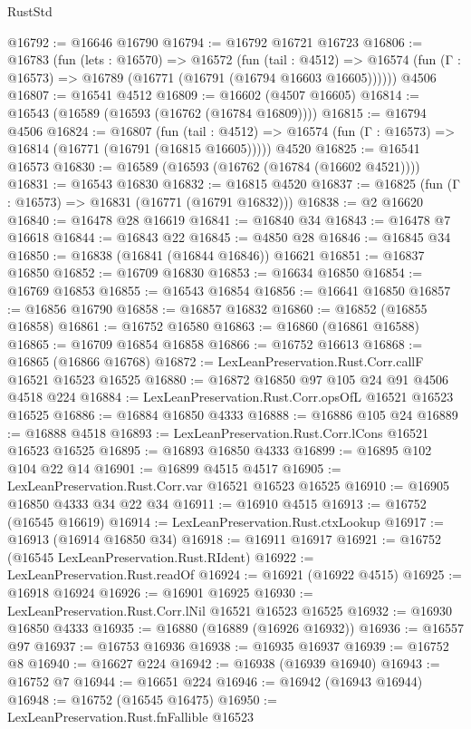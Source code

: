 \begin{lexlean}{RustStd}
\begin{coremodule}
@16792 := @16646 @16790
@16794 := @16792 @16721 @16723
@16806 := @16783
    (fun (lets : @16570) =>
    @16572
      (fun (tail : @4512) =>
      @16574 (fun (Γ : @16573) => @16789 (@16771 (@16791 (@16794 @16603 @16605))))))
    @4506
@16807 := @16541 @4512
@16809 := @16602 (@4507 @16605)
@16814 := @16543 (@16589 (@16593 (@16762 (@16784 @16809))))
@16815 := @16794 @4506
@16824 := @16807
    (fun (tail : @4512) => @16574 (fun (Γ : @16573) => @16814 (@16771 (@16791 (@16815 @16605)))))
    @4520
@16825 := @16541 @16573
@16830 := @16589 (@16593 (@16762 (@16784 (@16602 @4521))))
@16831 := @16543 @16830
@16832 := @16815 @4520
@16837 := @16825 (fun (Γ : @16573) => @16831 (@16771 (@16791 @16832)))
@16838 := @2 @16620
@16840 := @16478 @28 @16619
@16841 := @16840 @34
@16843 := @16478 @7 @16618
@16844 := @16843 @22
@16845 := @4850 @28
@16846 := @16845 @34
@16850 := @16838 (@16841 (@16844 @16846)) @16621
@16851 := @16837 @16850
@16852 := @16709 @16830
@16853 := @16634 @16850
@16854 := @16769 @16853
@16855 := @16543 @16854
@16856 := @16641 @16850
@16857 := @16856 @16790
@16858 := @16857 @16832
@16860 := @16852 (@16855 @16858)
@16861 := @16752 @16580
@16863 := @16860 (@16861 @16588)
@16865 := @16709 @16854 @16858
@16866 := @16752 @16613
@16868 := @16865 (@16866 @16768)
@16872 := LexLeanPreservation.Rust.Corr.callF @16521 @16523 @16525
@16880 := @16872 @16850 @97 @105 @24 @91 @4506 @4518 @224
@16884 := LexLeanPreservation.Rust.Corr.opsOfL @16521 @16523 @16525
@16886 := @16884 @16850 @4333
@16888 := @16886 @105 @24
@16889 := @16888 @4518
@16893 := LexLeanPreservation.Rust.Corr.lCons @16521 @16523 @16525
@16895 := @16893 @16850 @4333
@16899 := @16895 @102 @104 @22 @14
@16901 := @16899 @4515 @4517
@16905 := LexLeanPreservation.Rust.Corr.var @16521 @16523 @16525
@16910 := @16905 @16850 @4333 @34 @22 @34
@16911 := @16910 @4515
@16913 := @16752 (@16545 @16619)
@16914 := LexLeanPreservation.Rust.ctxLookup
@16917 := @16913 (@16914 @16850 @34)
@16918 := @16911 @16917
@16921 := @16752 (@16545 LexLeanPreservation.Rust.RIdent)
@16922 := LexLeanPreservation.Rust.readOf
@16924 := @16921 (@16922 @4515)
@16925 := @16918 @16924
@16926 := @16901 @16925
@16930 := LexLeanPreservation.Rust.Corr.lNil @16521 @16523 @16525
@16932 := @16930 @16850 @4333
@16935 := @16880 (@16889 (@16926 @16932))
@16936 := @16557 @97
@16937 := @16753 @16936
@16938 := @16935 @16937
@16939 := @16752 @8
@16940 := @16627 @224
@16942 := @16938 (@16939 @16940)
@16943 := @16752 @7
@16944 := @16651 @224
@16946 := @16942 (@16943 @16944)
@16948 := @16752 (@16545 @16475)
@16950 := LexLeanPreservation.Rust.fnFallible @16523

\end{coremodule}
\end{lexlean}
